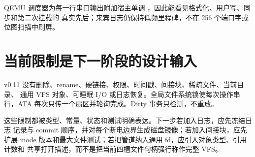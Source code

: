 QEMU 调度器为每一行串口输出附加宿主单调
\code{[QEMU][T+xxxxxxms]}，因此能看见格式化、用户写、同步和第二次挂载的
真实先后；来宾日志仍保持低频里程碑，不在 256 个端口字或位图扫描中刷屏。

\section{当前限制是下一阶段的设计输入}

v0.11 没有删除、rename、硬链接、权限、时间戳、间接块、稀疏文件、当前目录、
通用 VFS 对象、可睡眠 I/O 或日志恢复。全局文件系统锁使每次操作串行，ATA
每次只传一个扇区并轮询完成。Dirty 事务只检测，不重放。

这些限制都被类型、常量、状态和测试明确表达。下一步若加入日志，应先冻结日志
记录与 commit 顺序，并对每个断电边界生成磁盘镜像；若加入间接块，应先扩展
inode 版本和最大文件测试；若把管道纳入通用 fd，应引入对象类型、引用计数和
共享打开描述，而不是把当前四槽文件句柄强行称作完整 VFS。
